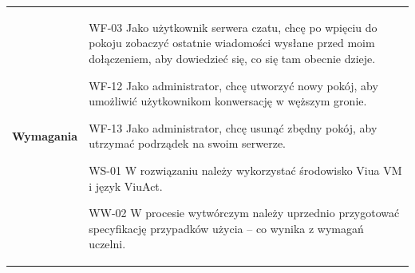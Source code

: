 \begin{tabular}{ | l | l | }
    \hline
    \parbox[t]{3cm}{
    	\textbf{Wymagania}
    } & \parbox[t]{12cm}{\strut
      \begin{labreq}
        \item[WF-03] Jako użytkownik serwera czatu, chcę po wpięciu do
        pokoju zobaczyć ostatnie wiadomości wysłane przed moim
        dołączeniem, aby dowiedzieć się, co się tam obecnie dzieje.
        \item[WF-12] Jako administrator, chcę utworzyć
        nowy pokój, aby umożliwić użytkownikom konwersację w węższym
        gronie.
        \item[WF-13] Jako administrator, chcę usunąć
        zbędny pokój, aby utrzymać podrządek na swoim serwerze.
        \item[WS-01] W rozwiązaniu należy wykorzystać
        środowisko Viua VM i język ViuAct.
        \item[WW-02] W procesie wytwórczym należy
        uprzednio przygotować specyfikację przypadków użycia -- co
        wynika z wymagań uczelni.
      \end{labreq}
      \strut} \\
    \hline
\end{tabular}

\vspace{1em}

